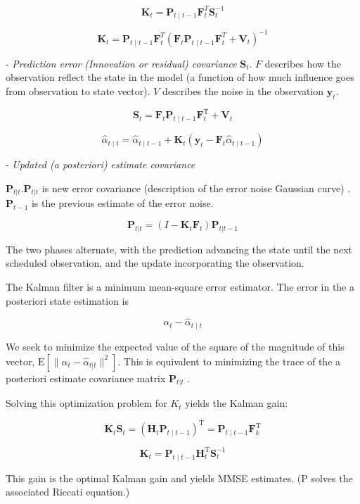 $$\mathbf{K}_t = \mathbf{P}_{t\mid t-1}\mathbf{F}_t^T \mathbf{S}_t^{-1}$$



$$\mathbf{K}_t = \mathbf{P}_{t\mid t-1}\mathbf{F}_t^T (\mathbf{F}_t \mathbf{P}_{t\mid t-1} \mathbf{F}_t^T + \mathbf{V}_t)^{-1}$$

- \textit{Prediction error (Innovation or residual) covariance}  $\mathbf{S}_t$.  $F$ describes  how the observation reflect the state in the model (a function of how much influence goes from observation to state vector). $V$ describes the noise in the  observation $\mathbf{y}_t$.

$$	\mathbf{S}_t = \mathbf{F}_t \mathbf{P}_{t\mid t-1} \mathbf{F}_{t}^\text{T} + \mathbf{V}_t $$



$$\hat{\alpha}_{t\mid t} = \hat{\alpha}_{t\mid t-1} + \mathbf{K}_t (\mathbf{y}_t - \mathbf{F}_t\hat{\alpha}_{t\mid t-1})$$




- \textit{Updated (a posteriori) estimate covariance} 


$\mathbf{P}_{t|t}$.$\mathbf{P}_{t|t}$ is new error covariance (description of the error noise Gaussian curve) . $\mathbf{P}_{t-1}$ is the previous estimate of the error noise. 

$$\mathbf{P}_{t|t} = (I - \mathbf{K}_t \mathbf{F}_t) \mathbf{P}_{t|t-1}$$


The two phases alternate, with the prediction advancing the state until the next scheduled observation, and the update incorporating the observation. 


The Kalman filter is a minimum mean-square error estimator. The error in the a posteriori state estimation is


$$\alpha_{t} - \hat{\alpha}_{t\mid t}$$


We seek to minimize the expected value of the square of the magnitude of this vector, $\textrm{E}[\|\alpha_{t} - \hat{\alpha}_{t|t}\|^2]$. This is equivalent to minimizing the trace of the a posteriori estimate covariance matrix $\mathbf{P}_{t|t}$ . 

Solving this optimization problem for $K_t$ yields the Kalman gain:


$$\mathbf{K}_t \mathbf{S}_t = (\mathbf{H}_t \mathbf{P}_{t\mid t-1})^\text{T} = \mathbf{P}_{t\mid t-1} \mathbf{F}_k^\text{T}$$


$$\mathbf{K}_{t} = \mathbf{P}_{t\mid t-1} \mathbf{H}_t^\text{T} \mathbf{S}_t^{-1}$$


This gain  is  the optimal Kalman gain and yields MMSE estimates.  (P solves the associated Riccati equation.)


